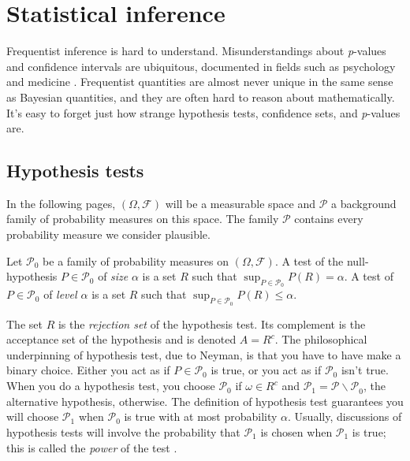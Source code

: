 \section{Statistical inference}

Frequentist inference is hard to understand. Misunderstandings about \textit{p}-values and confidence intervals are ubiquitous, documented in fields such as psychology \parencite{Belia2005-di,Gigerenzer2018-oi} and medicine \parencite{Goodman2008-ed,Gigerenzer2007-qi}. Frequentist quantities are almost never unique in the same sense as Bayesian quantities, and they are often hard to reason about mathematically. It's easy to forget just how strange hypothesis tests, confidence
sets, and \textit{p}-values are. 

\subsection{Hypothesis tests}

In the following pages, $(\Omega,\mathcal{\mathcal{F}})$ will be a measurable space and $\mathcal{P}$ a background family of probability measures on this space. The family $\mathcal{P}$ contains every probability measure we consider plausible. 
\begin{definition}
\parencite[][Chapter 3.1]{Lehmann2005-sp} Let $\mathcal{P}_{0}$ be a family
of probability measures on $(\Omega,\mathcal{F})$. A test of the
null-hypothesis $P\in\mathcal{P}_{0}$ of \emph{size} $\alpha$ is
a set $R$ such that $\sup_{P\in\mathcal{P}_{0}}P(R)=\alpha.$ A test
of $P\in\mathcal{P}_{0}$ of \emph{level $\alpha$ }is a set $R$
such that $\sup_{P\in\mathcal{P}_{0}}P(R)\leq\alpha.$
\end{definition}

The set $R$ is the \emph{rejection set} of the hypothesis test. Its complement is the acceptance set of the hypothesis and is denoted $A=R^{c}$. The philosophical underpinning of hypothesis test, due to Neyman, is that you have to have make a binary choice. Either you act as if $P\in\mathcal{P}_{0}$ is true, or you act as if $\mathcal{P}_{0}$ isn't true. When you do a hypothesis test, you choose $\mathcal{P}_{0}$ if $\omega\in R^{c}$ and $\mathcal{P}_{1}=\mathcal{P\backslash P}_{0}$, the alternative hypothesis, otherwise. The definition of hypothesis test guarantees you will choose $\mathcal{P}_{1}$ when $\mathcal{P}_{0}$ is true with at most probability $\alpha$. Usually, discussions of hypothesis tests will involve the probability that $\mathcal{P}_{1}$ is chosen when $\mathcal{P}_{1}$ is true; this is called the \emph{power} of the test \parencite{Neyman1977-nx}.

